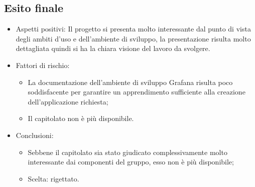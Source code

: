 \subsection{Esito finale}
    \begin{itemize}
        \item Aspetti positivi: Il progetto si presenta molto interessante dal punto di vista degli ambiti d'uso e dell'ambiente di sviluppo, la presentazione risulta molto dettagliata quindi si ha la chiara visione del lavoro da svolgere.
        \item Fattori di rischio:
            \begin{itemize}
                \item La documentazione dell'ambiente di sviluppo Grafana risulta poco soddisfacente per garantire un apprendimento sufficiente alla creazione dell'applicazione richiesta;
                \item Il capitolato non è più disponibile.
            \end{itemize}
        \item Conclusioni:
            \begin{itemize}
                \item Sebbene il capitolato sia stato giudicato complessivamente molto interessante dai componenti del gruppo, esso non è più disponibile;
		        \item Scelta: rigettato.
            \end{itemize}
    \end{itemize}